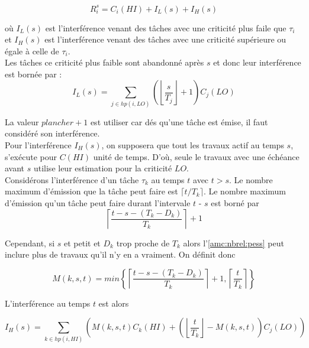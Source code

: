 \documentclass[12pt,a4paper,oneside]{book}
\theoremstyle{break}
\theoremstyle{breakplain}
\begin{document}
\begin{equation}
R_i^s = C_i(HI) + I_L(s) + I_H(s)
\end{equation}

où $I_L(s)$ est l'interférence venant des tâches avec une criticité plus faile que $\tau_i$ et $I_H(s)$ est l'interférence venant des tâches avec une criticité supérieure ou égale à celle de $\tau_i$.\\

Les tâches ce criticité plus faible sont abandonné après $s$ et donc leur interférence est bornée par :
\begin{equation}
I_L(s) = \underset{j \in hp(i, LO)}{\sum} (\left\lfloor \dfrac{s}{T_j} \right\rfloor + 1) C_j(LO)
\end{equation}

La valeur $plancher +1$ est utiliser car dés qu'une tâche est émise, il faut considéré son interférence.\\

Pour l'interférence $I_H(s)$, on supposera que tout les travaux actif au temps $s$, s'exécute pour $C(HI)$ unité de temps. D'où, seule le travaux avec une échéance avant $s$ utilise leur estimation pour la criticité $LO$.\\
Considérons l'interférence d'un tâche $\tau_k$ au temps $t$ avec $t > s$. Le nombre maximum d'émission que la tâche peut faire est $\lceil t / T_k \rceil$. Le nombre maximum d'émission qu'un tâche peut faire durant l'intervale $t$ - $s$ est borné par 
\begin{equation}
\label{amc:nbrel:pess}
\left\lceil \dfrac{t-s-(T_k-D_k)}{T_k} \right\rceil +1
\end{equation}

Cependant, si $s$ et petit et $D_k$ trop proche de $T_k$ alors l'\autoref{amc:nbrel:pess} peut inclure plus de travaux qu'il n'y en a vraiment. On définit donc

\begin{equation}
M(k,s,t) = min \left\lbrace \left\lceil \dfrac{t-s-(T_k-D_k)}{T_k} \right\rceil +1, \left\lceil \dfrac{t}{T_k} \right\rceil \right\rbrace
\end{equation}

L'interférence au temps $t$ est alors

\begin{equation}
I_H(s) = \underset{k \in hp(i, HI)}{\sum} \left( M(k,s,t)C_k(HI) + \left(\left\lfloor \dfrac{t}{T_k} \right\rfloor - M(k,s,t)\right) C_j(LO) \right)
\end{equation}
\end{document}
